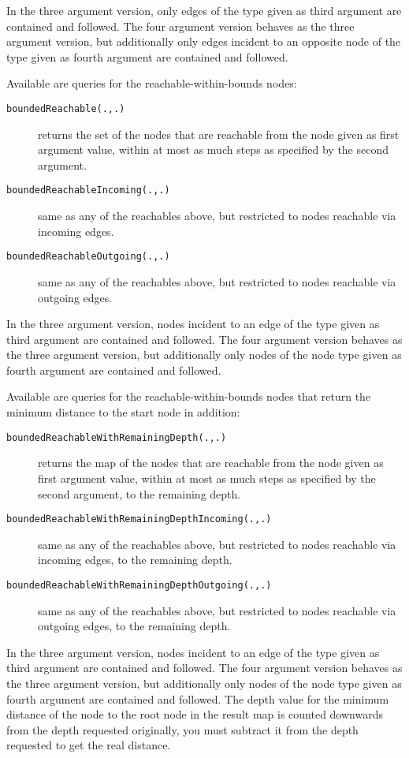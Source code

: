 In the three argument version, only edges of the type given as third argument are contained and followed.
The four argument version behaves as the three argument version, but additionally only edges incident to an opposite node of the type given as fourth argument are contained and followed.

Available are queries for the reachable-within-bounds nodes:

\begin{description}
\item[\texttt{boundedReachable(.,.)}] returns the set of the nodes that are reachable from the node given as first argument value, within at most as much steps as specified by the second argument.
\item[\texttt{boundedReachableIncoming(.,.)}] same as any of the reachables above, but restricted to nodes reachable via incoming edges.
\item[\texttt{boundedReachableOutgoing(.,.)}] same as any of the reachables above, but restricted to nodes reachable via outgoing edges.
\end{description}

In the three argument version, nodes incident to an edge of the type given as third argument are contained and followed.
The four argument version behaves as the three argument version, but additionally only nodes of the node type given as fourth argument are contained and followed.

Available are queries for the reachable-within-bounds nodes that return the minimum distance to the start node in addition:

\begin{description}
\item[\texttt{boundedReachableWithRemainingDepth(.,.)}] returns the map of the nodes that are reachable from the node given as first argument value, within at most as much steps as specified by the second argument, to the remaining depth.
\item[\texttt{boundedReachableWithRemainingDepthIncoming(.,.)}] same as any of the reachables above, but restricted to nodes reachable via incoming edges, to the remaining depth.
\item[\texttt{boundedReachableWithRemainingDepthOutgoing(.,.)}] same as any of the reachables above, but restricted to nodes reachable via outgoing edges, to the remaining depth.
\end{description}

In the three argument version, nodes incident to an edge of the type given as third argument are contained and followed.
The four argument version behaves as the three argument version, but additionally only nodes of the node type given as fourth argument are contained and followed.
The depth value for the minimum distance of the node to the root node in the result map is counted downwards from the depth requested originally, you must subtract it from the depth requested to get the real distance.

